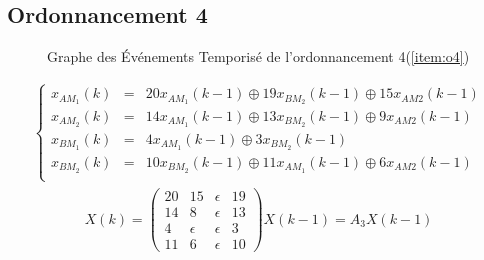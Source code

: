 \subsection{Ordonnancement 4}
\begin{figure}[!ht]
\centering
\caption{\label{fig:get} Graphe des Événements Temporisé de l'ordonnancement 4(\ref{item:o4})}
\end{figure}
\begin{align*}%
\left\lbrace
\begin{array}{lcl}
x_{AM_1}(k)&=& 20x_{AM_1}(k-1) \oplus 19x_{BM_2}(k-1) \oplus 15x_{AM2}(k-1)\\
x_{AM_2}(k)&=& 14x_{AM_1}(k-1) \oplus 13x_{BM_2}(k-1) \oplus  9x_{AM2}(k-1)\\
x_{BM_1}(k)&=&  4x_{AM_1}(k-1) \oplus  3x_{BM_2}(k-1)\\
x_{BM_2}(k)&=& 10x_{BM_2}(k-1) \oplus 11x_{AM_1}(k-1) \oplus  6x_{AM2}(k-1)\\
\end{array}
\right.
\end{align*}
\begin{align}\label{eqn::ee_Ordo4}
X(k) = \begin{pmatrix}
20&15&\epsilon&19\\
14&8&\epsilon&13\\
4&\epsilon&\epsilon&3\\
11&6&\epsilon&10
\end{pmatrix}X(k-1) = A_3X(k-1)
\end{align}